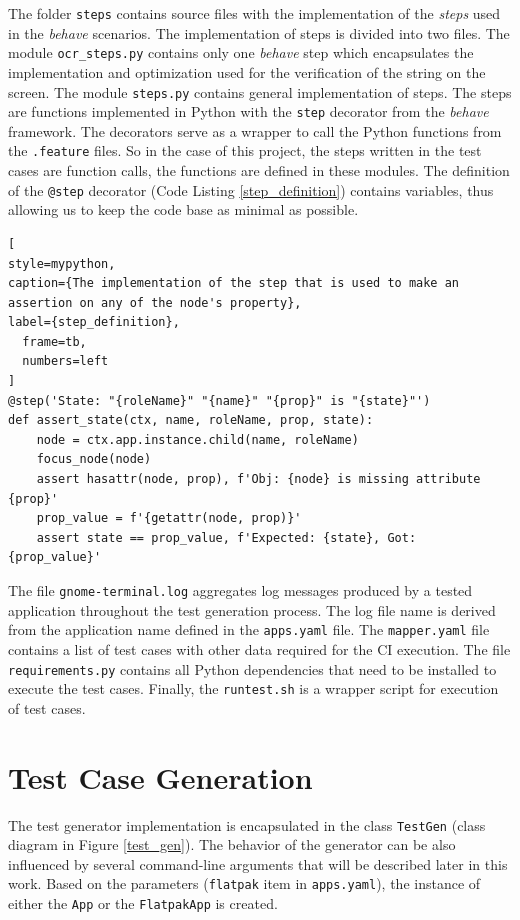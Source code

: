 The folder \texttt{steps} contains source files with the implementation of the \textit{steps} used in the \textit{behave} scenarios. The implementation of steps is divided into two files. The module \texttt{ocr\_steps.py} contains only one \textit{behave} step which encapsulates the implementation and optimization used for the verification of the string on the screen. The module \texttt{steps.py} contains general implementation of steps. The steps are functions implemented in Python with the \texttt{step} decorator from the \textit{behave} framework. The decorators serve as a wrapper to call the Python functions from the \texttt{.feature} files. So in the case of this project, the steps written in the test cases are function calls, the functions are defined in these modules. The definition of the \texttt{@step} decorator (Code Listing \ref{step_definition}) contains variables, thus allowing us to keep the code base as minimal as possible.

\begin{lstlisting}[
style=mypython,
caption={The implementation of the step that is used to make an assertion on any of the node's property},
label={step_definition},
  frame=tb,
  numbers=left
]
@step('State: "{roleName}" "{name}" "{prop}" is "{state}"')
def assert_state(ctx, name, roleName, prop, state):
    node = ctx.app.instance.child(name, roleName)
    focus_node(node)
    assert hasattr(node, prop), f'Obj: {node} is missing attribute {prop}'
    prop_value = f'{getattr(node, prop)}'
    assert state == prop_value, f'Expected: {state}, Got: {prop_value}'
\end{lstlisting}

The file \texttt{gnome-terminal.log} aggregates log messages produced by a tested application throughout the test generation process. The log file name is derived from the application name defined in the \texttt{apps.yaml} file. The \texttt{mapper.yaml} file contains a list of test cases with other data required for the CI execution. The file \texttt{requirements.py} contains all Python dependencies that need to be installed to execute the test cases. Finally, the \texttt{runtest.sh} is a wrapper script for execution of test cases.

\section{Test Case Generation}
The test generator implementation is encapsulated in the class \texttt{TestGen} (class diagram in Figure \ref{test_gen}). The behavior of the generator can be also influenced by several command-line arguments that will be described later in this work. Based on the parameters (\texttt{flatpak} item in \texttt{apps.yaml}), the instance of either the \texttt{App} or the \texttt{FlatpakApp} is created. 

